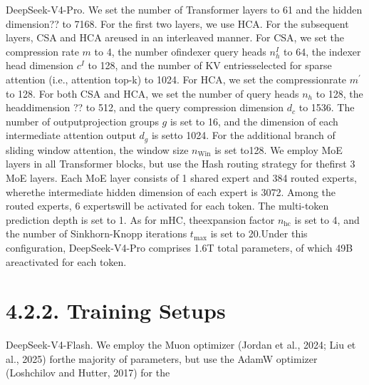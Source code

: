 \documentclass[
  10
]{article}
\begin{document}
DeepSeek-V4-Pro. We set the number of Transformer layers to 61 and the
hidden dimension?? to 7168. For the first two layers, we use HCA. For
the subsequent layers, CSA and HCA areused in an interleaved manner. For
CSA, we set the compression rate \(m\) to 4, the number ofindexer query
heads \(n _ { h } ^ { I }\) to 64, the indexer head dimension
\(c ^ { I }\) to 128, and the number of KV entriesselected for sparse
attention (i.e., attention top-k) to 1024. For HCA, we set the
compressionrate \(m ^ { \prime }\) to 128. For both CSA and HCA, we set
the number of query heads \(n _ { h }\) to 128, the headdimension ?? to
512, and the query compression dimension \(d _ { c }\) to 1536. The
number of outputprojection groups \(g\) is set to 16, and the dimension
of each intermediate attention output \(d _ { g }\) is setto 1024. For
the additional branch of sliding window attention, the window size
\(n _ { \mathrm { W i n } }\) is set to128. We employ MoE layers in all
Transformer blocks, but use the Hash routing strategy for thefirst 3 MoE
layers. Each MoE layer consists of 1 shared expert and 384 routed
experts, wherethe intermediate hidden dimension of each expert is 3072.
Among the routed experts, 6 expertswill be activated for each token. The
multi-token prediction depth is set to 1. As for mHC, theexpansion
factor \(n _ { \mathrm { h c } }\) is set to 4, and the number of
Sinkhorn-Knopp iterations \(t _ { \mathrm { m a x } }\) is set to
20.Under this configuration, DeepSeek-V4-Pro comprises 1.6T total
parameters, of which 49B areactivated for each token.

\section{4.2.2. Training Setups}\label{training-setups}

DeepSeek-V4-Flash. We employ the Muon optimizer (Jordan et al., 2024;
Liu et al., 2025) forthe majority of parameters, but use the AdamW
optimizer (Loshchilov and Hutter, 2017) for the
\end{document}
